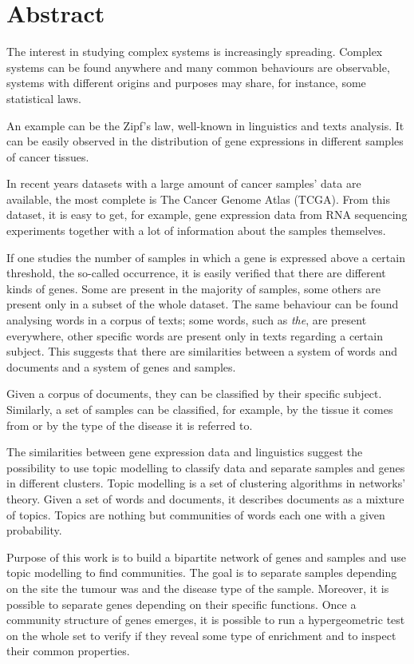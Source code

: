 \chapter*{Abstract}
The interest in studying complex systems is increasingly spreading.
Complex systems can be found anywhere and many common behaviours are
observable, systems with different origins and purposes may share, for
instance, some statistical laws.

An example can be the Zipf's law, well-known in linguistics and texts
analysis. It can be easily observed in the distribution of gene expressions
in different samples of cancer tissues.

In recent years datasets with a large amount of cancer samples' data are
available, the most complete is The Cancer Genome Atlas (TCGA). From
this dataset, it is easy to get, for example, gene expression data from
RNA sequencing experiments together with a lot of information about the
samples themselves.

If one studies the number of samples in which a gene is expressed above
a certain threshold, the so-called occurrence, it is easily verified
that there are different kinds of genes. Some are present in the
majority of samples, some others are present only in a subset of the
whole dataset. The same behaviour can be found analysing words in
a corpus of texts; some words, such as \emph{the}, are present everywhere,
other specific words are present only in texts regarding a certain
subject. This suggests that there are similarities between a system of
words and documents and a system of genes and samples.

Given a corpus of documents, they can be classified by their specific
subject. Similarly, a set of samples can be classified, for
example, by the tissue it comes from or by the type of the disease it is
referred to.

The similarities between gene expression data and linguistics suggest
the possibility to use topic modelling to classify data and separate
samples and genes in different clusters. Topic modelling is a set of
clustering algorithms in networks' theory. Given a set of words and
documents, it describes documents as a mixture of topics. Topics are
nothing but communities of words each one with a given probability.

Purpose of this work is to build a bipartite network of genes and
samples and use topic modelling to find communities. The goal is to
separate samples depending on the site the tumour was and the disease
type of the sample. Moreover, it is possible to separate genes depending
on their specific functions. Once a community structure of genes
emerges, it is possible to run a hypergeometric test on the whole set to verify if they reveal some type of enrichment and to inspect
their common properties.

